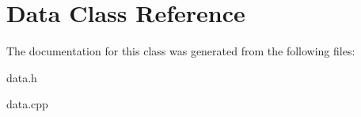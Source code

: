 \hypertarget{classData}{}\section{Data Class Reference}
\label{classData}


The documentation for this class was generated from the following files\+:\begin{DoxyCompactItemize}
\item 
data.\+h\item 
data.\+cpp\end{DoxyCompactItemize}
